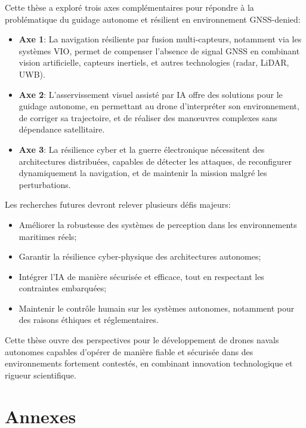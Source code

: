 \documentclass[12pt, a4paper, twoside, openright]{report}
\begin{document}
Cette thèse a exploré trois axes complémentaires pour répondre à la problématique du guidage autonome et résilient en environnement GNSS-denied:
\begin{itemize}
    \item \textbf{Axe 1}: La navigation résiliente par fusion multi-capteurs, notamment via les systèmes VIO, permet de compenser l’absence de signal GNSS en combinant vision artificielle, capteurs inertiels, et autres technologies (radar, LiDAR, UWB).
    \item \textbf{Axe 2}: L’asservissement visuel assisté par IA offre des solutions pour le guidage autonome, en permettant au drone d’interpréter son environnement, de corriger sa trajectoire, et de réaliser des manœuvres complexes sans dépendance satellitaire.
    \item \textbf{Axe 3}: La résilience cyber et la guerre électronique nécessitent des architectures distribuées, capables de détecter les attaques, de reconfigurer dynamiquement la navigation, et de maintenir la mission malgré les perturbations.
\end{itemize}

Les recherches futures devront relever plusieurs défis majeurs:
\begin{itemize}
    \item Améliorer la robustesse des systèmes de perception dans les environnements maritimes réels;
    \item Garantir la résilience cyber-physique des architectures autonomes;
    \item Intégrer l’IA de manière sécurisée et efficace, tout en respectant les contraintes embarquées;
    \item Maintenir le contrôle humain sur les systèmes autonomes, notamment pour des raisons éthiques et réglementaires.
\end{itemize}

Cette thèse ouvre des perspectives pour le développement de drones navals autonomes capables d’opérer de manière fiable et sécurisée dans des environnements fortement contestés, en combinant innovation technologique et rigueur scientifique.

\cleardoublepage


\appendix
\chapter{Annexes}
\end{document}
